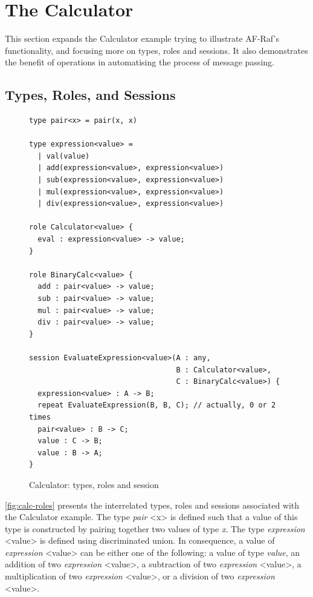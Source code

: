 \documentclass[a4paper,12pt,oneside,fleqn]{book} %
\begin{document}
\section{The Calculator} %

This section expands the Calculator example trying to illustrate AF-Raf's
functionality, and focusing more on types, roles and sessions. It also
demonstrates the benefit of operations in automatising the process of
message passing.

\subsection{Types, Roles, and Sessions} %
\begin{figure}\footnotesize %
\begin{verbatim}
type pair<x> = pair(x, x)

type expression<value> =
  | val(value)
  | add(expression<value>, expression<value>)
  | sub(expression<value>, expression<value>)
  | mul(expression<value>, expression<value>)
  | div(expression<value>, expression<value>)

role Calculator<value> {
  eval : expression<value> -> value;
}

role BinaryCalc<value> {
  add : pair<value> -> value;
  sub : pair<value> -> value;
  mul : pair<value> -> value;
  div : pair<value> -> value;
}

session EvaluateExpression<value>(A : any,
                                  B : Calculator<value>,
                                  C : BinaryCalc<value>) {
  expression<value> : A -> B;
  repeat EvaluateExpression(B, B, C); // actually, 0 or 2 times
  pair<value> : B -> C;
  value : C -> B;
  value : B -> A;
}
\end{verbatim}
\caption{Calculator: types, roles and session}
\label{fig:calc-roles}
\end{figure} %

\autoref{fig:calc-roles} presents the interrelated types, roles and
sessions associated with the Calculator example. The type \textit{pair} <x>
is defined such that a value of this type is constructed by pairing
together two values of type \textit{x}. The type \textit{expression}
<value> is defined using discriminated union. In consequence, a value of
\textit{expression} <value> can be either one of the following: a value of
type \textit{value}, an addition of two \textit{expression} <value>, a
subtraction of two \textit{expression} <value>, a multiplication of two
\textit{expression} <value>, or a division of two \textit{expression}
<value>.
\end{document}
